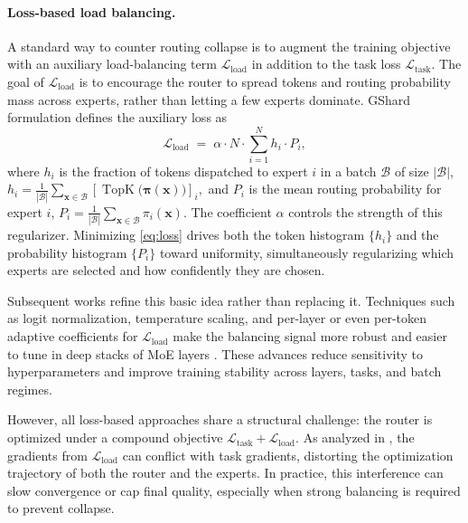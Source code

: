 \documentclass[sigconf,nonacm]{acmart}
\begin{document}
\paragraph{Loss-based load balancing.}
A standard way to counter routing collapse is to augment the training objective with an auxiliary load-balancing term $\mathcal{L}_{\text{load}}$ in addition to the task loss $\mathcal{L}_{\text{task}}$.
The goal of $\mathcal{L}_{\text{load}}$ is to encourage the router to spread tokens and routing probability mass across experts, rather than letting a few experts dominate.
GShard formulation \citep{gshard} defines the auxiliary loss as
\begin{equation}
    \label{eq:loss}
    \mathcal{L}_{\text{load}}
    \;=\;
    \alpha \cdot N\cdot \sum_{i=1}^N h_i \cdot P_i,
\end{equation}
where $h_i$ is the fraction of tokens dispatched to expert $i$ in a batch $\mathcal{B}$ of size $|\mathcal{B}|$,
$
h_i
=
\frac{1}{|\mathcal{B}|}
\sum_{\mathbf{x} \in \mathcal{B}}
\left[\operatorname{TopK}\big(\bm{\pi}(\mathbf{x})\big)\right]_i,
$
and $P_i$ is the mean routing probability for expert $i$,
$P_i
=
\frac{1}{|\mathcal{B}|}
\sum_{\mathbf{x} \in \mathcal{B}}
\pi_i(\mathbf{x}).$
The coefficient $\alpha$ controls the strength of this regularizer.
Minimizing \eqref{eq:loss} drives both the token histogram $\{h_i\}$ and the probability histogram $\{P_i\}$ toward uniformity, simultaneously regularizing which experts are selected and how confidently they are chosen.

Subsequent works refine this basic idea rather than replacing it.
Techniques such as logit normalization, temperature scaling, and per-layer or even per-token adaptive coefficients for $\mathcal{L}_{\text{load}}$ make the balancing signal more robust and easier to tune in deep stacks of MoE layers \citep{switch, skywork, glam, stmoe, openmoe, deepseekmoe, shen2024jetmoe}.
These advances reduce sensitivity to hyperparameters and improve training stability across layers, tasks, and batch regimes.

However, all loss-based approaches share a structural challenge: the router is optimized under a compound objective $\mathcal{L}_{\text{task}} + \mathcal{L}_{\text{load}}$.
As analyzed in \citet{lossfree}, the gradients from $\mathcal{L}_{\text{load}}$ can conflict with task gradients, distorting the optimization trajectory of both the router and the experts.
In practice, this interference can slow convergence or cap final quality, especially when strong balancing is required to prevent collapse.
\end{document}

